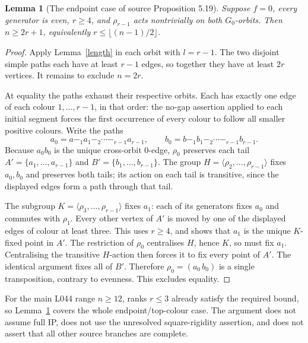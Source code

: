 \documentclass[11pt,a4paper]{article}
\newtheorem{lemma}{Lemma}
\newcommand{\gen}[1]{\langle#1\rangle}
\begin{document}
\begin{lemma}[The endpoint case of source Proposition 5.19]\label{endpoint}
Suppose $f=0$, every generator is even, $r\ge4$, and
$\rho_{r-1}$ acts nontrivially on both $G_0$-orbits. Then
$n\ge2r+1$, equivalently $r\le\lfloor(n-1)/2\rfloor$.
\end{lemma}
\begin{proof}
Apply Lemma~\ref{length} in each orbit with $l=r-1$. The two
disjoint simple paths each have at least $r-1$ edges, so together
they have at least $2r$ vertices. It remains to exclude $n=2r$.

At equality the paths exhaust their respective orbits. Each has
exactly one edge of each colour $1,\ldots,r-1$, in that order:
the no-gap assertion applied to each initial segment forces the
first occurrence of every colour to follow all smaller positive
colours. Write the paths
\[
 a_0=a\mathrel{-_1}a_1\mathrel{-_2}\cdots
 \mathrel{-_{r-1}}a_{r-1},\qquad
 b_0=b\mathrel{-_1}b_1\mathrel{-_2}\cdots
 \mathrel{-_{r-1}}b_{r-1}.
\]
Because $a_0b_0$ is the unique cross-orbit $0$-edge,
$\rho_0$ preserves each tail $A'=\{a_1,\ldots,a_{r-1}\}$ and
$B'=\{b_1,\ldots,b_{r-1}\}$. The group
$H=\gen{\rho_2,\ldots,\rho_{r-1}}$ fixes $a_0,b_0$ and
preserves both tails; its action on each tail is transitive,
since the displayed edges form a path through that tail.

The subgroup $K=\gen{\rho_3,\ldots,\rho_{r-1}}$ fixes $a_1$:
each of its generators fixes $a_0$ and commutes with $\rho_1$.
Every other vertex of $A'$ is moved by one of the displayed
edges of colour at least three. This uses $r\ge4$, and shows
that $a_1$ is the unique $K$-fixed point in $A'$. The restriction
of $\rho_0$ centralises $H$, hence $K$, so must fix $a_1$.
Centralising the transitive $H$-action then forces it to fix
every point of $A'$. The identical argument fixes all of $B'$.
Therefore $\rho_0=(a_0\,b_0)$ is a single transposition,
contrary to evenness. This excludes equality.
\end{proof}

For the main L044 range $n\ge12$, ranks $r\le3$ already satisfy
the required bound, so Lemma~\ref{endpoint} covers the whole
endpoint/top-colour case. The argument does not assume full IP,
does not use the unresolved square-rigidity assertion, and does
not assert that all other source branches are complete.
\end{document}
